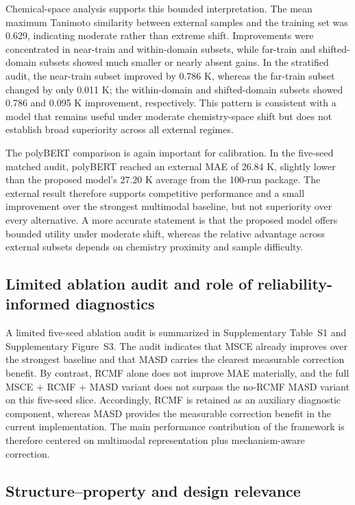 \documentclass[review,12pt]{elsarticle}
\begin{document}
Chemical-space analysis supports this bounded interpretation. The mean maximum Tanimoto similarity between external samples and the training set was 0.629, indicating moderate rather than extreme shift. Improvements were concentrated in near-train and within-domain subsets, while far-train and shifted-domain subsets showed much smaller or nearly absent gains. In the stratified audit, the near-train subset improved by 0.786 K, whereas the far-train subset changed by only 0.011 K; the within-domain and shifted-domain subsets showed 0.786 and 0.095 K improvement, respectively. This pattern is consistent with a model that remains useful under moderate chemistry-space shift but does not establish broad superiority across all external regimes.

The polyBERT comparison is again important for calibration. In the five-seed matched audit, polyBERT reached an external MAE of 26.84 K, slightly lower than the proposed model's 27.20 K average from the 100-run package. The external result therefore supports competitive performance and a small improvement over the strongest multimodal baseline, but not superiority over every alternative. A more accurate statement is that the proposed model offers bounded utility under moderate shift, whereas the relative advantage across external subsets depends on chemistry proximity and sample difficulty.

\subsection{Limited ablation audit and role of reliability-informed diagnostics}

A limited five-seed ablation audit is summarized in Supplementary Table~S1 and Supplementary Figure~S3. The audit indicates that MSCE already improves over the strongest baseline and that MASD carries the clearest measurable correction benefit. By contrast, RCMF alone does not improve MAE materially, and the full MSCE + RCMF + MASD variant does not surpass the no-RCMF MASD variant on this five-seed slice. Accordingly, RCMF is retained as an auxiliary diagnostic component, whereas MASD provides the measurable correction benefit in the current implementation. The main performance contribution of the framework is therefore centered on multimodal representation plus mechanism-aware correction.

\subsection{Structure--property and design relevance}
\end{document}

